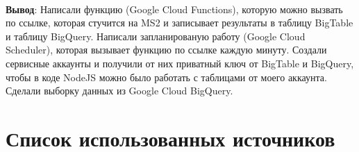 \documentclass[12pt, a4paper, simple]{eskdtext}
\begin{document}
  \paragraph{} \textbf{Вывод}:
  Написали функцию (Google Cloud Functions), которую можно вызвать по ссылке,
  которая стучится на MS2 и записывает результаты в таблицу BigTable и таблицу BigQuery.
  Написали запланированую работу (Google Cloud Scheduler), которая вызывает функцию по ссылке каждую минуту.
  Создали сервисные аккаунты и получили от них приватный ключ от BigTable и BigQuery,
  чтобы в коде NodeJS можно было работать с таблицами от моего аккаунта.
  Сделали выборку данных из Google Cloud BigQuery.

  \begingroup
    \section*{Список использованных источников} %

    \renewcommand{\addcontentsline}[3]{}%
    \renewcommand{\section}[2]{}%
\end{document}
